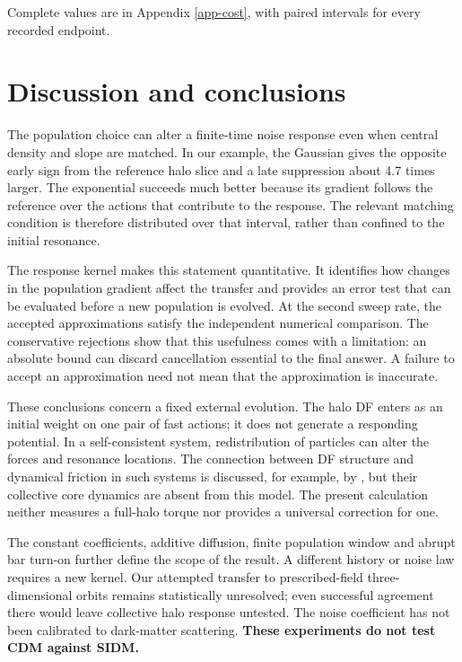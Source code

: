 \documentclass[fleqn,usenatbib]{mnras}
\begin{document}
Complete values are in Appendix \ref{app-cost}, with paired intervals for every recorded endpoint.

\section{Discussion and conclusions}\label{limitations}

The population choice can alter a finite-time noise response even when central density and slope are matched. In our example, the Gaussian gives the opposite early sign from the reference halo slice and a late suppression about 4.7 times larger. The exponential succeeds much better because its gradient follows the reference over the actions that contribute to the response. The relevant matching condition is therefore distributed over that interval, rather than confined to the initial resonance.

The response kernel makes this statement quantitative. It identifies how changes in the population gradient affect the transfer and provides an error test that can be evaluated before a new population is evolved. At the second sweep rate, the accepted approximations satisfy the independent numerical comparison. The conservative rejections show that this usefulness comes with a limitation: an absolute bound can discard cancellation essential to the final answer. A failure to accept an approximation need not mean that the approximation is inaccurate.

These conclusions concern a fixed external evolution. The halo DF enters as an initial weight on one pair of fast actions; it does not generate a responding potential. In a self-consistent system, redistribution of particles can alter the forces and resonance locations. The connection between DF structure and dynamical friction in such systems is discussed, for example, by \citet{Dattathri2026}, but their collective core dynamics are absent from this model. The present calculation neither measures a full-halo torque nor provides a universal correction for one.

The constant coefficients, additive diffusion, finite population window and abrupt bar turn-on further define the scope of the result. A different history or noise law requires a new kernel. Our attempted transfer to prescribed-field three-dimensional orbits remains statistically unresolved; even successful agreement there would leave collective halo response untested. The noise coefficient has not been calibrated to dark-matter scattering. \textbf{These experiments do not test CDM against SIDM.}
\end{document}
